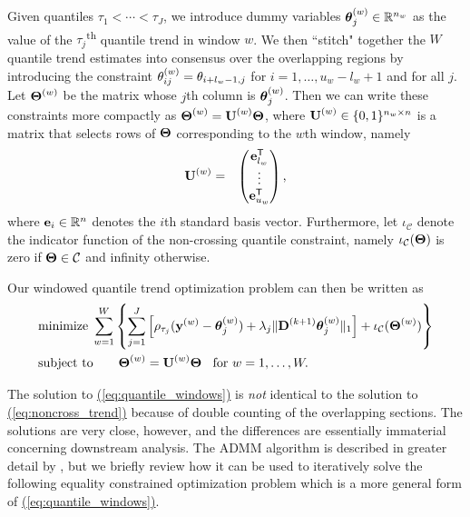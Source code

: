 \documentclass[aoas]{imsart}
\newcommand{\Eqn}[1]{\hyperref[eq:#1]{{\rm (\ref*{eq:#1})}}} %
\newcommand{\Eqn}[1]{{(\ref{eq:#1})}} %
\newcommand{\Real}{\mathbb{R}}
\newcommand{\Tra}{^{\sf T}} %
\newcommand{\V}[1]{{\bm{\mathbf{\MakeLowercase{#1}}}}} %
\newcommand{\VE}[2]{\MakeLowercase{#1}_{#2}} %
\newcommand{\Vn}[2]{\V{#1}^{(#2)}} %
\newcommand{\VnE}[3]{{#1}^{(#2)}_{#3}} %
\newcommand{\M}[1]{{\bm{\mathbf{\MakeUppercase{#1}}}}} %
\newcommand{\Mn}[2]{\M{#1}^{(#2)}} %
\begin{document}
 Given quantiles $\tau_1 < \cdots < \tau_J$, we introduce dummy variables $\Vn{\theta}{w}_{j} \in \Real^{n_w}$ as the value of the $\tau_j$\textsuperscript{th} quantile trend in window $w$. We then ``stitch" together the $W$ quantile trend estimates into consensus over the overlapping regions by introducing the constraint $\VnE{\theta}{w}{ij} = \VE{\theta}{i + l_w - 1,j}$ for $i = 1, \ldots, u_w - l_w + 1$ and for all $j$. Let $\Mn{\Theta}{w}$ be the matrix whose $j$th column is $\Vn{\theta}{w}_{j}$. Then we can write these constraints more compactly as $\Mn{\Theta}{w} = \Mn{U}{w}\M{\Theta}$, where $\Mn{U}{w} \in \{0, 1\}^{n_w \times n}$ is a matrix that selects rows of $\M{\Theta}$ corresponding to the $w$th window, namely
 \begin{eqnarray*}
 	\Mn{U}{w} & = & \begin{pmatrix}
 		\V{e}_{l_w}\Tra \\
 		\vdots \\
 		\V{e}_{u_w}\Tra
 	\end{pmatrix},
 \end{eqnarray*}
 where $\V{e}_i \in \Real^{n}$ denotes the $i$th standard basis vector. Furthermore, let $\iota_{\mathcal{C}}$ denote the indicator function of the non-crossing quantile constraint, namely $\iota_{\mathcal{C}}(\M{\Theta})$ is zero if $\M{\Theta} \in \mathcal{C}$ and infinity otherwise.
 
 Our windowed quantile trend optimization problem can then be written as
 \begin{equation}
 \label{eq:quantile_windows}
 \begin{split}
 &\text{minimize}\; \sum_{w=1}^W \left \{\sum_{j=1}^J \left [\rho_{\tau_j}(\Vn{y}{w} - \Vn{\theta}{w}_{j}) +
 \lambda_j \lVert \Mn{D}{k+1} \Vn{\theta}{w}_{j} \rVert_1 \right ] + \iota_\mathcal{C}(\Mn{\Theta}{w}) \right\}\\
 &\text{subject to} \qquad \Mn{\Theta}{w} = \Mn{U}{w}\M{\Theta} \;\; \text{ for } w = 1, \ldots, W.
 \end{split}
 \end{equation}
  
 The solution to \Eqn{quantile_windows} is {\em not} identical to the solution to \Eqn{noncross_trend} because of double counting of the overlapping sections. The solutions are very close, however, and the differences are essentially immaterial concerning downstream analysis. The ADMM algorithm \citep{gabay1975dual, glowinski1975approximation} is  described in greater detail by \cite{boyd2011distributed}, but we briefly review how it can be used to iteratively solve the following equality constrained optimization problem which is a more general form of \Eqn{quantile_windows}.
\end{document}
